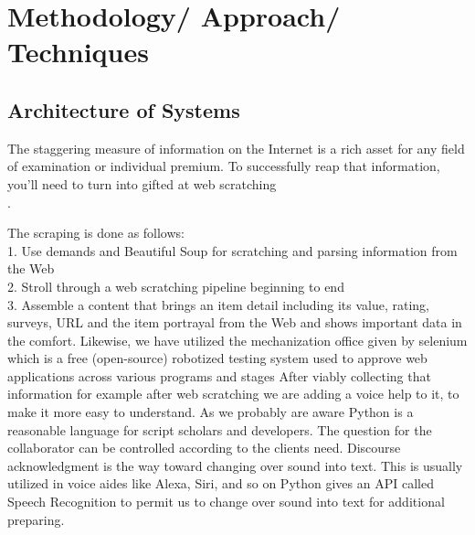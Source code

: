 \newpage
\chapter{Methodology/ Approach/ Techniques}

\section{Architecture of Systems}

The staggering measure of information on the Internet is a rich asset for any field of
examination or individual premium. To successfully reap that information, you'll need to
turn into gifted at web scratching\\.

The scraping is done as follows:\\
1. Use demands and Beautiful Soup for scratching and parsing information from the Web\\
2. Stroll through a web scratching pipeline beginning to end\\
3. Assemble a content that brings an item detail including its value, rating, surveys, URL and
the item portrayal from the Web and shows important data in the comfort. Likewise, we
have utilized the mechanization office given by selenium which is a free (open-source)
robotized testing system used to approve web applications across various programs and
stages After viably collecting that information for example after web scratching we are
adding a voice help to it, to make it more easy to understand. As we probably are aware
Python is a reasonable language for script scholars and developers. The question for the
collaborator can be controlled according to the clients need. Discourse acknowledgment is
the way toward changing over sound into text. This is usually utilized in voice aides like
Alexa, Siri, and so on Python gives an API called Speech Recognition to permit us to change
over sound into text for additional preparing.\\

